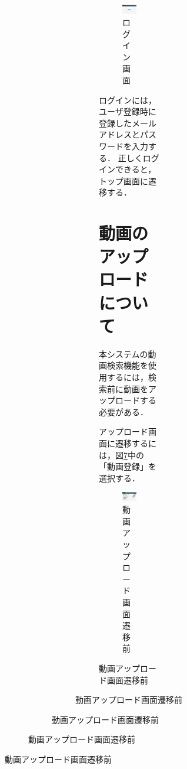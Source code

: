 \documentclass[a4j,12pt,dvipdfmx]{jreport}
\begin{document}
\begin{figure}[H]
\begin{figure}[H]
\begin{figure}[H]
\begin{figure}[H]
\begin{figure}[H]
\begin{figure}[b]
  \centering
  \includegraphics[width=13cm]{image/user_login.jpg}
  \caption{ログイン画面}
  \label{fig:user_login}
\end{figure}

ログインには，ユーザ登録時に登録したメールアドレスとパスワードを入力する．
正しくログインできると，トップ画面に遷移する．

\section{動画のアップロードについて}
本システムの動画検索機能を使用するには，検索前に動画をアップロードする必要がある．

アップロード画面に遷移するには，図\ref{fig:index}中の「動画登録」を選択する．

\begin{figure}[b]
  \centering
  \includegraphics[width=13cm]{image/index.jpg}
  \caption{動画アップロード画面遷移前}
  \label{fig:index}
\end{figure}


\end{figure}
\end{figure}
\end{figure}
\end{figure}
\end{figure}
\end{document}
